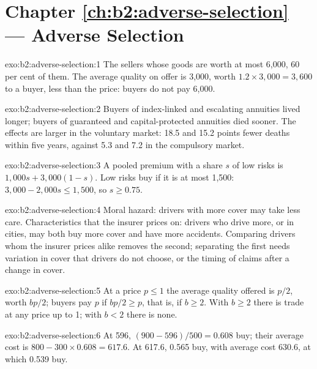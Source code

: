 \section*{Chapter \ref{ch:b2:adverse-selection} --- Adverse Selection}

\begin{solution}{exo:b2:adverse-selection:1}
The sellers whose goods are worth at most 6{,}000, 60 per cent of them. The average quality on offer is 3{,}000, worth $1.2 \times 3{,}000 =
3{,}600$ to a buyer, less than the price: buyers do not pay 6{,}000.
\end{solution}

\begin{solution}{exo:b2:adverse-selection:2}
Buyers of index-linked and escalating annuities lived longer; buyers of guaranteed and capital-protected annuities died
sooner. The effects are larger in the voluntary market: 18.5 and 15.2 points fewer deaths within five years, against 5.3
and 7.2 in the compulsory market.
\end{solution}

\begin{solution}{exo:b2:adverse-selection:3}
A pooled premium with a share $s$ of low risks is $1{,}000s + 3{,}000(1 - s)$. Low risks buy if it is at most 1{,}500: $3{,}000 - 2{,}000s \le 1{,}500$, so $s \ge 0.75$.
\end{solution}

\begin{solution}{exo:b2:adverse-selection:4}
Moral hazard: drivers with more cover may take less care. Characteristics that the insurer prices on: drivers who drive more,
or in cities, may both buy more cover and have more accidents. Comparing drivers whom the insurer prices alike removes the
second; separating the first needs variation in cover that drivers do not choose, or the timing of claims after a change
in cover.
\end{solution}

\begin{solution}{exo:b2:adverse-selection:5}
At a price $p \le 1$ the average quality offered is $p/2$, worth $bp/2$; buyers pay $p$ if $bp/2 \ge p$, that is, if $b \ge 2$. With $b \ge 2$ there is trade
at any price up to 1; with $b < 2$ there is none.
\end{solution}

\begin{solution}{exo:b2:adverse-selection:6}
At 596, $(900 - 596)/500 = 0.608$ buy; their average cost is $800 - 300 \times 0.608 = 617.6$. At 617.6, 0.565 buy, with average cost 630.6, at which
0.539 buy.
\end{solution}

